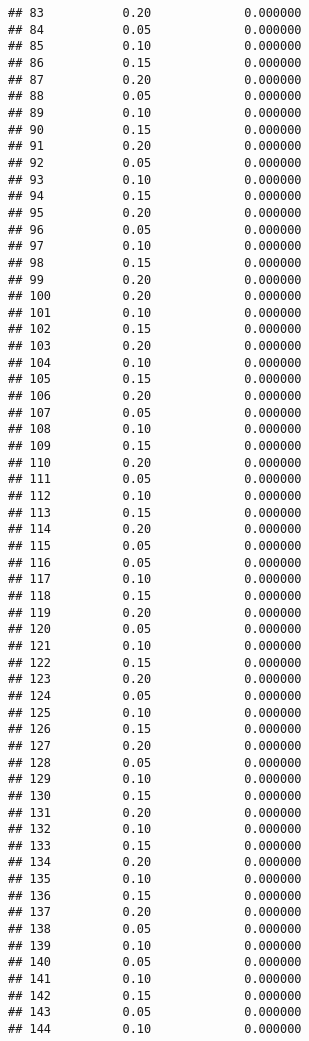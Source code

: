 \documentclass[
]{article}
\begin{document}
\begin{verbatim}
## 83           0.20             0.000000
## 84           0.05             0.000000
## 85           0.10             0.000000
## 86           0.15             0.000000
## 87           0.20             0.000000
## 88           0.05             0.000000
## 89           0.10             0.000000
## 90           0.15             0.000000
## 91           0.20             0.000000
## 92           0.05             0.000000
## 93           0.10             0.000000
## 94           0.15             0.000000
## 95           0.20             0.000000
## 96           0.05             0.000000
## 97           0.10             0.000000
## 98           0.15             0.000000
## 99           0.20             0.000000
## 100          0.20             0.000000
## 101          0.10             0.000000
## 102          0.15             0.000000
## 103          0.20             0.000000
## 104          0.10             0.000000
## 105          0.15             0.000000
## 106          0.20             0.000000
## 107          0.05             0.000000
## 108          0.10             0.000000
## 109          0.15             0.000000
## 110          0.20             0.000000
## 111          0.05             0.000000
## 112          0.10             0.000000
## 113          0.15             0.000000
## 114          0.20             0.000000
## 115          0.05             0.000000
## 116          0.05             0.000000
## 117          0.10             0.000000
## 118          0.15             0.000000
## 119          0.20             0.000000
## 120          0.05             0.000000
## 121          0.10             0.000000
## 122          0.15             0.000000
## 123          0.20             0.000000
## 124          0.05             0.000000
## 125          0.10             0.000000
## 126          0.15             0.000000
## 127          0.20             0.000000
## 128          0.05             0.000000
## 129          0.10             0.000000
## 130          0.15             0.000000
## 131          0.20             0.000000
## 132          0.10             0.000000
## 133          0.15             0.000000
## 134          0.20             0.000000
## 135          0.10             0.000000
## 136          0.15             0.000000
## 137          0.20             0.000000
## 138          0.05             0.000000
## 139          0.10             0.000000
## 140          0.05             0.000000
## 141          0.10             0.000000
## 142          0.15             0.000000
## 143          0.05             0.000000
## 144          0.10             0.000000

\end{verbatim}
\end{document}
